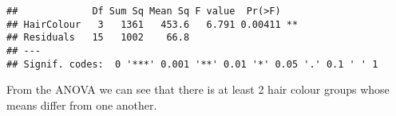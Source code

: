 \documentclass[
]{article}
\begin{document}
\begin{verbatim}
##             Df Sum Sq Mean Sq F value  Pr(>F)   
## HairColour   3   1361   453.6   6.791 0.00411 **
## Residuals   15   1002    66.8                   
## ---
## Signif. codes:  0 '***' 0.001 '**' 0.01 '*' 0.05 '.' 0.1 ' ' 1
\end{verbatim}

From the ANOVA we can see that there is at least 2 hair colour groups
whose means differ from one another.
\end{document}
